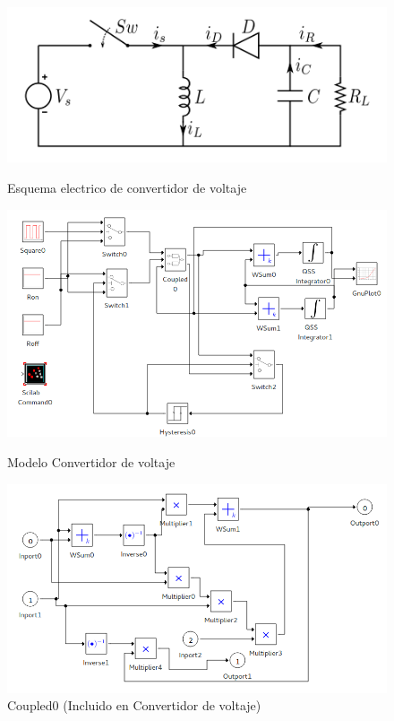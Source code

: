 \begin{figure}[H]
\centering
 \includegraphics[width=.60\linewidth]{Buckboost_conventions}
 \label{buckdisk-squema}
 \caption{Esquema electrico de convertidor de voltaje}
\end{figure}

\begin{figure}[H]
\includegraphics[width=0.75\linewidth]{buck_disk}
 \label{model:buckdisk}
\caption{Modelo Convertidor de voltaje}
\end{figure}

\begin{figure}[H]
\includegraphics[width=0.75\linewidth]{buck_disk_coupled0}
\caption{Coupled0 (Incluido en Convertidor de voltaje)}
\label{model:buckdisk_coupled0}
\end{figure}

